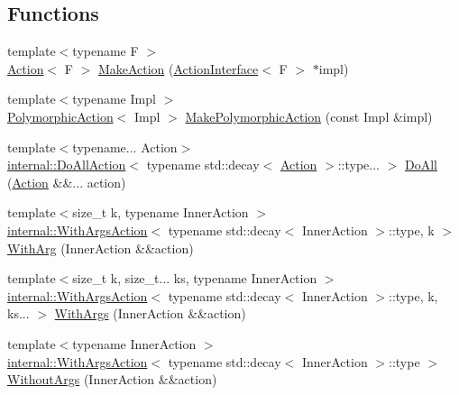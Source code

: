 \subsection*{Functions}
\begin{DoxyCompactItemize}
\item 
{\footnotesize template$<$typename F $>$ }\\\mbox{\hyperlink{classtesting_1_1_action}{Action}}$<$ F $>$ \mbox{\hyperlink{namespacetesting_aa254d28c8d883899cbf11ea2f05fc195}{Make\+Action}} (\mbox{\hyperlink{classtesting_1_1_action_interface}{Action\+Interface}}$<$ F $>$ $\ast$impl)
\item 
{\footnotesize template$<$typename Impl $>$ }\\\mbox{\hyperlink{classtesting_1_1_polymorphic_action}{Polymorphic\+Action}}$<$ Impl $>$ \mbox{\hyperlink{namespacetesting_a45df529b8166936d970884383f0ede82}{Make\+Polymorphic\+Action}} (const Impl \&impl)
\item 
{\footnotesize template$<$typename... Action$>$ }\\\mbox{\hyperlink{structtesting_1_1internal_1_1_do_all_action}{internal\+::\+Do\+All\+Action}}$<$ typename std\+::decay$<$ \mbox{\hyperlink{classtesting_1_1_action}{Action}} $>$\+::type... $>$ \mbox{\hyperlink{namespacetesting_a3824c79dc6e9e05c337a675e82da2045}{Do\+All}} (\mbox{\hyperlink{classtesting_1_1_action}{Action}} \&\&... action)
\item 
{\footnotesize template$<$size\+\_\+t k, typename Inner\+Action $>$ }\\\mbox{\hyperlink{structtesting_1_1internal_1_1_with_args_action}{internal\+::\+With\+Args\+Action}}$<$ typename std\+::decay$<$ Inner\+Action $>$\+::type, k $>$ \mbox{\hyperlink{namespacetesting_ab27beef02a13e44e0448b9c50e763e0b}{With\+Arg}} (Inner\+Action \&\&action)
\item 
{\footnotesize template$<$size\+\_\+t k, size\+\_\+t... ks, typename Inner\+Action $>$ }\\\mbox{\hyperlink{structtesting_1_1internal_1_1_with_args_action}{internal\+::\+With\+Args\+Action}}$<$ typename std\+::decay$<$ Inner\+Action $>$\+::type, k, ks... $>$ \mbox{\hyperlink{namespacetesting_a4b8dc8233e7b92226ffe51e0d0040604}{With\+Args}} (Inner\+Action \&\&action)
\item 
{\footnotesize template$<$typename Inner\+Action $>$ }\\\mbox{\hyperlink{structtesting_1_1internal_1_1_with_args_action}{internal\+::\+With\+Args\+Action}}$<$ typename std\+::decay$<$ Inner\+Action $>$\+::type $>$ \mbox{\hyperlink{namespacetesting_a0e5b756e6cf3ebf3abfdc1c913eb6376}{Without\+Args}} (Inner\+Action \&\&action)

\end{DoxyCompactItemize}
